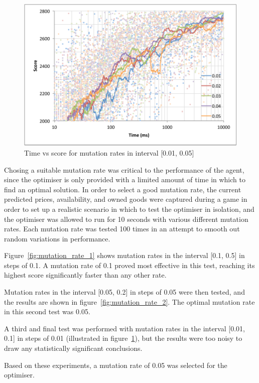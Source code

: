 \documentclass[a4paper]{proc}
\begin{document}
\begin{figure}
  \includegraphics[width=\linewidth]{mutation_rate_3.pdf}
  \caption{Time vs score for mutation rates in interval [0.01, 0.05]}
  \label{fig:mutation_rate_3}
\end{figure}

Chosing a suitable mutation rate was critical to the performance of the agent, since the optimiser is only provided with a limited amount of time in which to find an optimal solution. In order to select a good mutation rate, the current predicted prices, availability, and owned goods were captured during a game in order to set up a realistic scenario in which to test the optimiser in isolation, and the optimiser was allowed to run for 10 seconds with various different mutation rates. Each mutation rate was tested 100 times in an attempt to smooth out random variations in performance.

Figure~\ref{fig:mutation_rate_1} shows mutation rates in the interval [0.1, 0.5] in steps of 0.1. A mutation rate of 0.1 proved most effective in this test, reaching its highest score significantly faster than any other rate.

Mutation rates in the interval [0.05, 0.2] in steps of 0.05 were then tested, and the results are shown in figure~\ref{fig:mutation_rate_2}. The optimal mutation rate in this second test was 0.05.

A third and final test was performed with mutation rates in the interval [0.01, 0.1] in steps of 0.01 (illustrated in figure~\ref{fig:mutation_rate_3}), but the results were too noisy to draw any statistically significant conclusions.

Based on these experiments, a mutation rate of 0.05 was selected for the optimiser.
\end{document}
